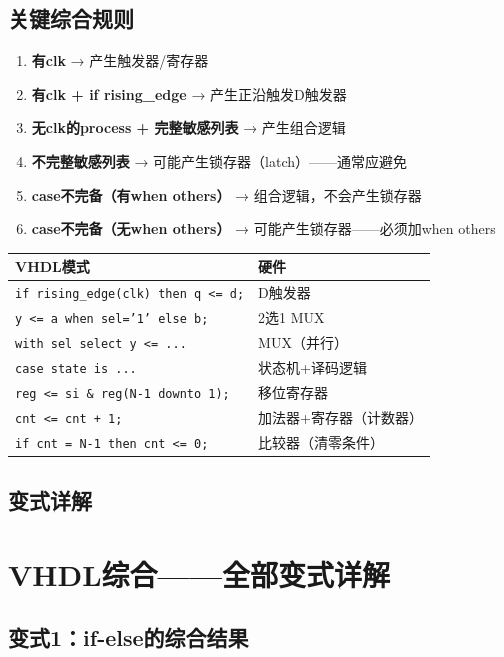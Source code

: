 \section{关键综合规则}

\begin{enumerate}
  \item \textbf{有clk} → 产生触发器/寄存器
  \item \textbf{有clk + if rising\_edge} → 产生正沿触发D触发器
  \item \textbf{无clk的process + 完整敏感列表} → 产生组合逻辑
  \item \textbf{不完整敏感列表} → 可能产生锁存器（latch）——通常应避免
  \item \textbf{case不完备（有when others）} → 组合逻辑，不会产生锁存器
  \item \textbf{case不完备（无when others）} → 可能产生锁存器——必须加when others
\end{enumerate}

\begin{examtip}[VHDL综合速查]
\begin{center}
\begin{tabular}{|l|l|}
\hline
\textbf{VHDL模式} & \textbf{硬件} \\
\hline
\texttt{if rising\_edge(clk) then q <= d;} & D触发器 \\
\texttt{y <= a when sel='1' else b;} & 2选1 MUX \\
\texttt{with sel select y <= ...} & MUX（并行） \\
\texttt{case state is ...} & 状态机+译码逻辑 \\
\texttt{reg <= si \& reg(N-1 downto 1);} & 移位寄存器 \\
\texttt{cnt <= cnt + 1;} & 加法器+寄存器（计数器） \\
\texttt{if cnt = N-1 then cnt <= 0;} & 比较器（清零条件） \\
\hline
\end{tabular}
\end{center}
\end{examtip}

\section{变式详解}
\chapter{VHDL综合——全部变式详解}

\section{变式1：if-else的综合结果}

